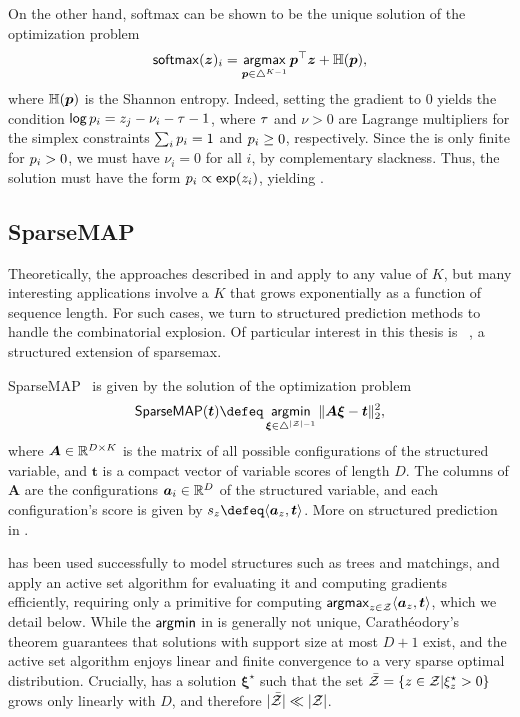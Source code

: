 On the other hand, softmax can be shown to be the unique solution of the optimization problem
\begin{equation}
    \operatorname*{\mathsf{softmax}}(\bm{z})_i =
    \operatorname*{\mathsf{argmax}}_{\bm{p} \in \triangle^{K-1}} \bm{p}^\top\bm{z} + \mathbb H(\bm{p}),
\end{equation}
where $\mathbb H(\bm{p})$ is the Shannon entropy.
Indeed, setting the gradient to $0$ yields the condition
$\operatorname*{\mathsf{log}} p_i = z_j - \nu_i - \tau - 1$, where $\tau$ and $\nu > 0$ are Lagrange
multipliers for the simplex constraints $\sum_i p_i = 1$ and $p_i \geq 0$,
respectively. Since the \lhs is only finite for $p_i>0$,
we must have $\nu_i=0$ for all $i$, by complementary
slackness. Thus, the solution must have the form $p_i \propto \operatorname*{\mathsf{exp}}(z_i)$, yielding .

\subsection{SparseMAP}\label{sec:smap_bg}

\noindent Theoretically, the approaches described in
 and  apply to any
value of $K$, but many interesting
applications involve a $K$ that grows exponentially as a function
of sequence length. For such cases, we turn to structured prediction
methods to handle the combinatorial explosion. Of particular interest
in this thesis is \smap~\citep{sparsemap, sparsemapcg}, a
structured extension of sparsemax.

\begin{definition}[SparseMAP]
    SparseMAP~\citep{sparsemap,
        sparsemapcg} is given by the solution of the optimization problem
    \begin{equation}\label{eq:sparsemap}
        \smapop(\bm{t}) \defeq \argmin_{\pv \in \simplex^{|\ZZ|-1}}
        \|\bm{A}\pv - \bm{t}\|_2^2,
    \end{equation}
    where $\bm{A}\in\mathbb{R}^{D\times K}$ is the matrix of all possible configurations
    of the structured variable, and $\bm{t}$ is a compact vector of variable scores of length $D$.
    The columns of $\bm{A}$ are the configurations $\bm{a}_i \in \mathbb{R}^D$ of the structured variable,
    and each configuration's score is given by $s_z \defeq \DP{\bm{a}_z}{\bm{t}}$.
    More on structured prediction in .
\end{definition}

\smap has been used successfully to model structures such as trees
and matchings, and \citet{sparsemap} apply an active set
algorithm for evaluating it and computing gradients efficiently,
requiring only a primitive for computing $\operatorname*{\mathsf{argmax}}_{z \in \mathcal{Z}} \langle
    \bm{a}_z, \bm{t}\rangle$, which we detail below. While the
$\operatorname*{\mathsf{argmin}}$ in  is generally not unique,
Carath\'eodory's theorem guarantees that solutions with support size
at most $D+1$ exist, and the active set algorithm enjoys linear and
finite convergence to a very sparse optimal distribution. Crucially,
 has a solution $\bm{\xi}^\star$ such that the
set $\bar{\mathcal{Z}} = \left\{z \in \mathcal{Z} |\xi^\star_z > 0\right\}$ grows
only linearly with $D$, and therefore $|\bar{\mathcal{Z}}| \ll |\mathcal{Z}|$.

